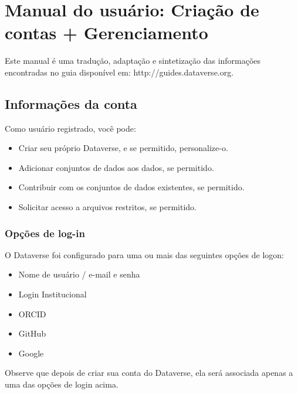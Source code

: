 \documentclass[12pt,hidelinks]{article}
\begin{document}
        
        \newpage
  
	\vspace{-1.5mm}
\newpage

\section{Manual do usuário: Criação de contas + Gerenciamento}
\vspace{10.5cm}

\qquad Este manual é uma tradução, adaptação e sintetização das informações encontradas no guia disponível em: http://guides.dataverse.org.

	\subsection{Informações da conta}
	
\qquad Como usuário registrado, você pode:

\begin{itemize}
    \item Criar seu próprio Dataverse, e se permitido, personalize-o.
    \item Adicionar conjuntos de dados aos dados, se permitido.
    \item Contribuir com os conjuntos de dados existentes, se permitido.
    \item Solicitar acesso a arquivos restritos, se permitido.
\end{itemize}
     	
        \subsubsection{Opções de log-in}
        
\qquad O Dataverse foi configurado para uma ou mais das seguintes opções de logon:
        
\begin{itemize}
\item Nome de usuário / e-mail e senha
\item Login Institucional
\item ORCID
\item GitHub
\item Google
\end{itemize}

Observe que depois de criar sua conta do Dataverse, ela será associada apenas a uma das opções de login acima.
\end{document}
